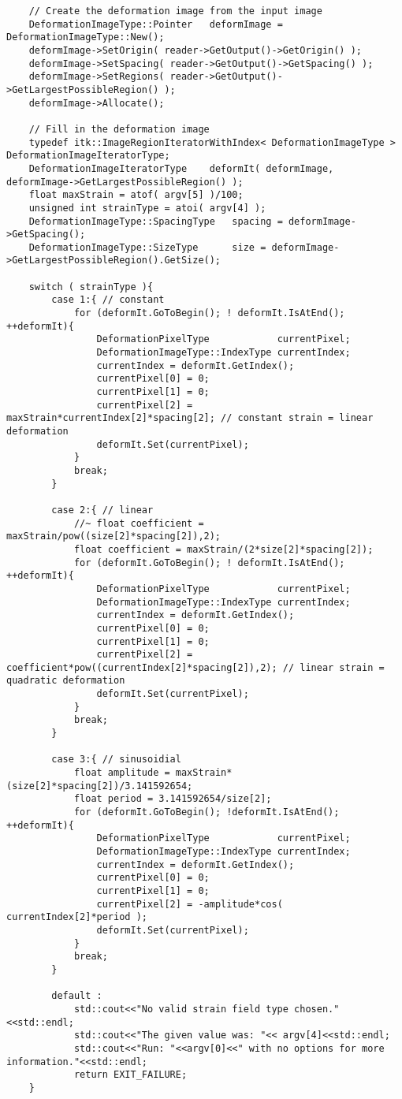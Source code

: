 \begin{lstlisting}
	// Create the deformation image from the input image
	DeformationImageType::Pointer	deformImage = DeformationImageType::New();
	deformImage->SetOrigin( reader->GetOutput()->GetOrigin() );
	deformImage->SetSpacing( reader->GetOutput()->GetSpacing() );
	deformImage->SetRegions( reader->GetOutput()->GetLargestPossibleRegion() );
	deformImage->Allocate();
	
	// Fill in the deformation image
	typedef itk::ImageRegionIteratorWithIndex< DeformationImageType >	DeformationImageIteratorType;
	DeformationImageIteratorType	deformIt( deformImage, deformImage->GetLargestPossibleRegion() );
	float maxStrain = atof( argv[5] )/100;
	unsigned int strainType = atoi( argv[4] );
	DeformationImageType::SpacingType	spacing = deformImage->GetSpacing();
	DeformationImageType::SizeType		size = deformImage->GetLargestPossibleRegion().GetSize();
	
	switch ( strainType ){
		case 1:{ // constant
			for (deformIt.GoToBegin(); ! deformIt.IsAtEnd(); ++deformIt){
				DeformationPixelType			currentPixel;
				DeformationImageType::IndexType	currentIndex;
				currentIndex = deformIt.GetIndex();
				currentPixel[0] = 0;
				currentPixel[1] = 0;
				currentPixel[2] = maxStrain*currentIndex[2]*spacing[2]; // constant strain = linear deformation
				deformIt.Set(currentPixel);
			}
			break;
		}
		
		case 2:{ // linear
			//~ float coefficient = maxStrain/pow((size[2]*spacing[2]),2);
			float coefficient = maxStrain/(2*size[2]*spacing[2]);
			for (deformIt.GoToBegin(); ! deformIt.IsAtEnd(); ++deformIt){
				DeformationPixelType			currentPixel;
				DeformationImageType::IndexType	currentIndex;
				currentIndex = deformIt.GetIndex();
				currentPixel[0] = 0;
				currentPixel[1] = 0;
				currentPixel[2] = coefficient*pow((currentIndex[2]*spacing[2]),2); // linear strain = quadratic deformation
				deformIt.Set(currentPixel);
			}
			break;
		}
			
		case 3:{ // sinusoidial
			float amplitude = maxStrain*(size[2]*spacing[2])/3.141592654;
			float period = 3.141592654/size[2];	
			for (deformIt.GoToBegin(); !deformIt.IsAtEnd(); ++deformIt){
				DeformationPixelType			currentPixel;
				DeformationImageType::IndexType	currentIndex;
				currentIndex = deformIt.GetIndex();
				currentPixel[0] = 0;
				currentPixel[1] = 0;
				currentPixel[2] = -amplitude*cos( currentIndex[2]*period );			
				deformIt.Set(currentPixel);
			}
			break;
		}
		
		default :
			std::cout<<"No valid strain field type chosen."<<std::endl;
			std::cout<<"The given value was: "<< argv[4]<<std::endl;
			std::cout<<"Run: "<<argv[0]<<" with no options for more information."<<std::endl;
			return EXIT_FAILURE;
	}
	

\end{lstlisting}
